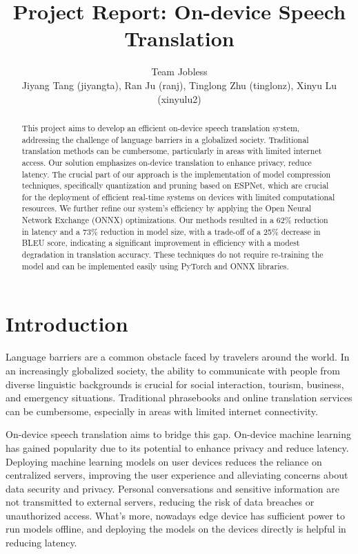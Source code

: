 \documentclass[11pt]{article}
\title{Project Report: On-device Speech Translation}
\author{
  Team Jobless\\
  Jiyang Tang (jiyangta), Ran Ju (ranj), Tinglong Zhu (tinglonz), Xinyu Lu (xinyulu2)\\
}
\begin{document}
\maketitle

\begin{abstract}

This project aims to develop an efficient on-device speech translation system, addressing the challenge of language barriers in a globalized society. Traditional translation methods can be cumbersome, particularly in areas with limited internet access. Our solution emphasizes on-device translation to enhance privacy, reduce latency. The crucial part of our approach is the implementation of model compression techniques, specifically quantization and pruning based on ESPNet, which are crucial for the deployment of efficient real-time systems on devices with limited computational resources. We further refine our system's efficiency by applying the Open Neural Network Exchange (ONNX) optimizations. Our methods resulted in a 62\% reduction in latency and a 73\% reduction in model size, with a trade-off of a 25\% decrease in BLEU score, indicating a significant improvement in efficiency with a modest degradation in translation accuracy. These techniques do not require re-training the model and can be implemented easily using PyTorch and ONNX libraries.
\end{abstract}




\section{Introduction}
Language barriers are a common obstacle faced by travelers around the world. In an increasingly globalized society, the ability to communicate with people from diverse linguistic backgrounds is crucial for social interaction, tourism, business, and emergency situations. Traditional phrasebooks and online translation services can be cumbersome, especially in areas with limited internet connectivity. 

On-device speech translation aims to bridge this gap. On-device machine learning has gained popularity due to its potential to enhance privacy and reduce latency. Deploying machine learning models on user devices reduces the reliance on centralized servers, improving the user experience and alleviating concerns about data security and privacy. Personal conversations and sensitive information are not transmitted to external servers, reducing the risk of data breaches or unauthorized access. What's more, nowadays edge device has sufficient power to run models offline, and deploying the models on the devices directly is helpful in reducing latency.
\end{document}
